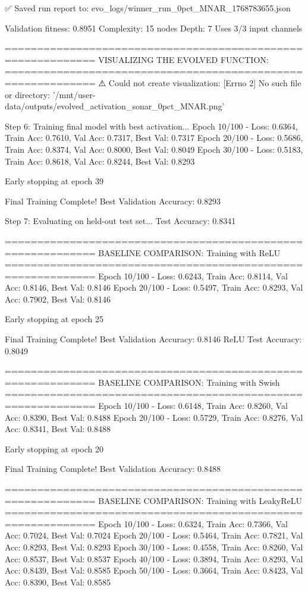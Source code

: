 ✅ Saved run report to: evo_logs/winner_run_0pct_MNAR_1768783655.json

Validation fitness: 0.8951
Complexity: 15 nodes
Depth: 7
Uses 3/3 input channels

============================================================
VISUALIZING THE EVOLVED FUNCTION:
============================================================
⚠️ Could not create visualization: [Errno 2] No such file or directory: '/mnt/user-data/outputs/evolved_activation_sonar_0pct_MNAR.png'

Step 6: Training final model with best activation...
Epoch  10/100 - Loss: 0.6364, Train Acc: 0.7610, Val Acc: 0.7317, Best Val: 0.7317
Epoch  20/100 - Loss: 0.5686, Train Acc: 0.8374, Val Acc: 0.8000, Best Val: 0.8049
Epoch  30/100 - Loss: 0.5183, Train Acc: 0.8618, Val Acc: 0.8244, Best Val: 0.8293

Early stopping at epoch 39

Final Training Complete!
Best Validation Accuracy: 0.8293

Step 7: Evaluating on held-out test set...
Test Accuracy: 0.8341

============================================================
BASELINE COMPARISON: Training with ReLU
============================================================
Epoch  10/100 - Loss: 0.6243, Train Acc: 0.8114, Val Acc: 0.8146, Best Val: 0.8146
Epoch  20/100 - Loss: 0.5497, Train Acc: 0.8293, Val Acc: 0.7902, Best Val: 0.8146

Early stopping at epoch 25

Final Training Complete!
Best Validation Accuracy: 0.8146
ReLU Test Accuracy: 0.8049

============================================================
BASELINE COMPARISON: Training with Swish
============================================================
Epoch  10/100 - Loss: 0.6148, Train Acc: 0.8260, Val Acc: 0.8390, Best Val: 0.8488
Epoch  20/100 - Loss: 0.5729, Train Acc: 0.8276, Val Acc: 0.8341, Best Val: 0.8488

Early stopping at epoch 20

Final Training Complete!
Best Validation Accuracy: 0.8488

============================================================
BASELINE COMPARISON: Training with LeakyReLU
============================================================
Epoch  10/100 - Loss: 0.6324, Train Acc: 0.7366, Val Acc: 0.7024, Best Val: 0.7024
Epoch  20/100 - Loss: 0.5464, Train Acc: 0.7821, Val Acc: 0.8293, Best Val: 0.8293
Epoch  30/100 - Loss: 0.4558, Train Acc: 0.8260, Val Acc: 0.8537, Best Val: 0.8537
Epoch  40/100 - Loss: 0.3894, Train Acc: 0.8293, Val Acc: 0.8439, Best Val: 0.8585
Epoch  50/100 - Loss: 0.3664, Train Acc: 0.8423, Val Acc: 0.8390, Best Val: 0.8585

